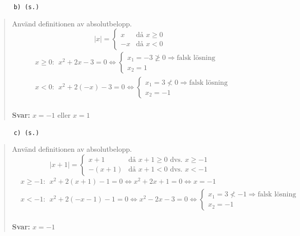 \documentclass[a4paper]{article}
\newcommand{\tskcol}[1]{\textcolor{tskcol}{#1}}
\begin{document}
	\texttt{\tskcol{~~~~~~b) (s.)}}
	\begin{quotation}
		\noindent
		Använd definitionen av absolutbelopp.
		\[|x|=
		\begin{cases}
		x& \text{då } x \ge 0 \\
		-x& \text{då } x < 0
		\end{cases}\]
		\begin{align*}
		& x \ge 0:~~ x^2+2x-3 = 0 \Leftrightarrow 
		\begin{cases}
		x_1=-3\not\ge 0 \Rightarrow\text{falsk lösning} \\
		x_2=1
		\end{cases}\\
		& x < 0:~~ x^2+2(-x)-3 = 0 \Leftrightarrow 
		\begin{cases}
		x_1=3\not< 0 \Rightarrow\text{falsk lösning} \\
		x_2=-1
		\end{cases}
		\end{align*}
		\\ 
		\textbf{Svar:} $x=-1$ eller $x=1$
	\end{quotation}
	
	\texttt{\tskcol{~~~~~~c) (s.)}}
	\begin{quotation}
		\noindent
		Använd definitionen av absolutbelopp.
		\[|x+1|=
		\begin{cases}
		x+1&    \text{då } x+1 \ge 0 \text{ dvs. } x \ge -1\\
		-(x+1)& \text{då } x+1 < 0   \text{ dvs. } x < -1
		\end{cases}\]
		\begin{align*}
		& x \ge -1:~~ x^2+2(x+1)-1 = 0 \Leftrightarrow x^2+2x+1=0 \Leftrightarrow x=-1\\
		& x < -1:~~ x^2+2(-x-1)-1 = 0 \Leftrightarrow x^2-2x-3 = 0 \Leftrightarrow
		\begin{cases}
		x_1=3\not< -1 \Rightarrow\text{falsk lösning} \\
		x_2=-1
		\end{cases}
		\end{align*}
		\\
		\textbf{Svar:} $x=-1$
	\end{quotation}
	
\end{document}
